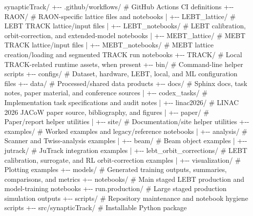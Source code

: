 \documentclass[
]{article}
\newenvironment{Shaded}{}{}
\newcommand{\NormalTok}[1]{#1}
\begin{document}
\begin{Shaded}
\begin{Highlighting}[]
\NormalTok{synapticTrack/}
\NormalTok{+{-}{-} .github/workflows/          \# GitHub Actions CI definitions}
\NormalTok{+{-}{-} RAON/                       \# RAON{-}specific lattice files and notebooks}
\NormalTok{|   +{-}{-} LEBT\_lattice/           \# LEBT TRACK lattice/input files}
\NormalTok{|   +{-}{-} LEBT\_notebooks/         \# LEBT calibration, orbit{-}correction, and extended{-}model notebooks}
\NormalTok{|   +{-}{-} MEBT\_lattice/           \# MEBT TRACK lattice/input files}
\NormalTok{|   +{-}{-} MEBT\_notebooks/         \# MEBT lattice creation/loading and segmented TRACK run notebooks}
\NormalTok{+{-}{-} TRACK/                      \# Local TRACK{-}related runtime assets, when present}
\NormalTok{+{-}{-} bin/                        \# Command{-}line helper scripts}
\NormalTok{+{-}{-} configs/                    \# Dataset, hardware, LEBT, local, and ML configuration files}
\NormalTok{+{-}{-} data/                       \# Processed/shared data products}
\NormalTok{+{-}{-} docs/                       \# Sphinx docs, task notes, paper material, and conference sources}
\NormalTok{|   +{-}{-} codex\_tasks/            \# Implementation task specifications and audit notes}
\NormalTok{|   +{-}{-} linac2026/              \# LINAC 2026 JACoW paper source, bibliography, and figures}
\NormalTok{|   +{-}{-} paper/                  \# Paper/report helper utilities}
\NormalTok{|   +{-}{-} site/                   \# Documentation/site helper utilities}
\NormalTok{+{-}{-} examples/                   \# Worked examples and legacy/reference notebooks}
\NormalTok{|   +{-}{-} analysis/               \# Scanner and Twiss{-}analysis examples}
\NormalTok{|   +{-}{-} beam/                   \# Beam object examples}
\NormalTok{|   +{-}{-} jutrack/                \# JuTrack integration examples}
\NormalTok{|   +{-}{-} lebt\_orbit\_corrections/ \# LEBT calibration, surrogate, and RL orbit{-}correction examples}
\NormalTok{|   +{-}{-} visualization/          \# Plotting examples}
\NormalTok{+{-}{-} models/                     \# Generated training outputs, summaries, comparisons, and metrics}
\NormalTok{+{-}{-} notebooks/                  \# Main staged LEBT production and model{-}training notebooks}
\NormalTok{+{-}{-} run.production/             \# Large staged production simulation outputs}
\NormalTok{+{-}{-} scripts/                    \# Repository maintenance and notebook hygiene scripts}
\NormalTok{+{-}{-} src/synapticTrack/          \# Installable Python package}

\end{Highlighting}
\end{Shaded}
\end{document}
